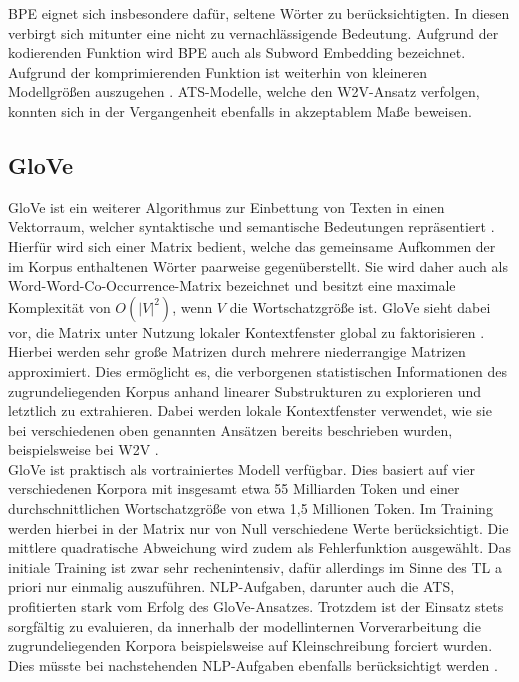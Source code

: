 \noindent
\ac{BPE} eignet sich insbesondere dafür, seltene Wörter zu berücksichtigten. In diesen verbirgt sich mitunter eine nicht zu vernachlässigende Bedeutung. Aufgrund der kodierenden Funktion wird \ac{BPE} auch als Subword Embedding bezeichnet. Aufgrund der komprimierenden Funktion ist weiterhin von kleineren Modellgrößen auszugehen \cite[S.~24]{NIT19}. \ac{ATS}-Modelle, welche den \ac{W2V}-Ansatz verfolgen, konnten sich in der Vergangenheit ebenfalls in akzeptablem Maße beweisen.


\subsection{GloVe}
\noindent
\ac{GloVe} ist ein weiterer Algorithmus zur Einbettung von Texten in einen Vektorraum, welcher syntaktische und semantische Bedeutungen repräsentiert \cite[S.~1]{PEN14}.\\

\noindent
Hierfür wird sich einer Matrix bedient, welche das gemeinsame Aufkommen der im Korpus enthaltenen Wörter paarweise gegenüberstellt. Sie wird daher auch als Word-Word-Co-Occurrence-Matrix bezeichnet und besitzt eine maximale Komplexität von $O(|V|^2)$, wenn $V$ die Wortschatzgröße ist. \ac{GloVe} sieht dabei vor, die Matrix unter Nutzung lokaler Kontextfenster global zu faktorisieren \cite[S.~2]{PEN14}.\\

\noindent
Hierbei werden sehr große Matrizen durch mehrere niederrangige Matrizen approximiert. Dies ermöglicht es, die verborgenen statistischen Informationen des zugrundeliegenden Korpus anhand linearer Substrukturen zu explorieren und letztlich zu extrahieren. Dabei werden lokale Kontextfenster verwendet, wie sie bei verschiedenen oben genannten Ansätzen bereits beschrieben wurden, beispielsweise bei \ac{W2V} \cite[S.~24]{NIT19}.\\

\noindent
\ac{GloVe} ist praktisch als vortrainiertes Modell verfügbar. Dies basiert auf vier verschiedenen Korpora mit insgesamt etwa 55 Milliarden Token und einer durchschnittlichen Wortschatzgröße von etwa 1,5 Millionen Token. Im Training werden hierbei in der Matrix nur von Null verschiedene Werte berücksichtigt. Die mittlere quadratische Abweichung wird zudem als Fehlerfunktion ausgewählt. Das initiale Training ist zwar sehr rechenintensiv, dafür allerdings im Sinne des \ac{TL} a priori nur einmalig auszuführen. \ac{NLP}-Aufgaben, darunter auch die \ac{ATS}, profitierten stark vom Erfolg des \ac{GloVe}-Ansatzes. Trotzdem ist der Einsatz stets sorgfältig zu evaluieren, da innerhalb der modellinternen Vorverarbeitung die zugrundeliegenden Korpora beispielsweise auf Kleinschreibung forciert wurden. Dies müsste bei nachstehenden \ac{NLP}-Aufgaben ebenfalls berücksichtigt werden \cite[S.~6-9]{PEN14}.


